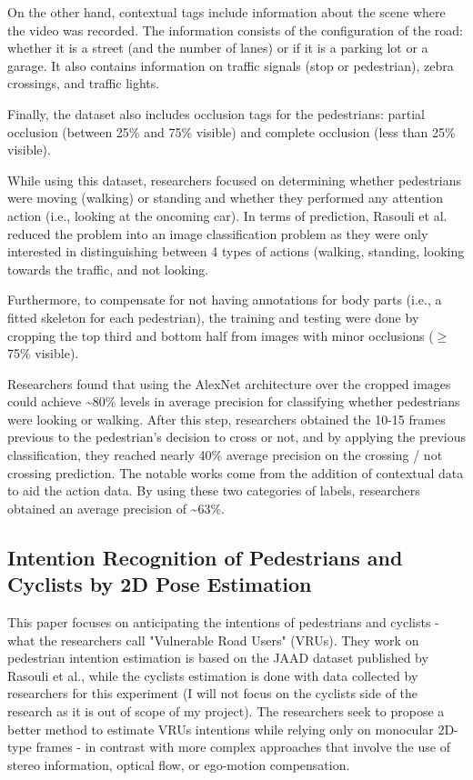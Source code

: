 \documentclass[conference, onecolumn]{IEEEtran}
\begin{document}
On the other hand, contextual tags include information about the scene where the video was recorded. The information consists of the configuration of the road: whether it is a street (and the number of lanes) or if it is a parking lot or a garage. It also contains information on traffic signals (stop or pedestrian), zebra crossings, and traffic lights.

Finally, the dataset also includes occlusion tags for the pedestrians: partial occlusion (between 25\% and 75\% visible) and complete occlusion (less than 25\% visible).

While using this dataset, researchers focused on determining whether pedestrians were moving (walking) or standing and whether they performed any attention action (i.e., looking at the oncoming car). In terms of prediction, Rasouli et al. reduced the problem into an image classification problem as they were only interested in distinguishing between 4 types of actions (walking, standing, looking towards the traffic, and not looking.

Furthermore, to compensate for not having annotations for body parts (i.e., a fitted skeleton for each pedestrian), the training and testing were done by cropping the top third and bottom half from images with minor occlusions ($\ge$ 75\% visible).

Researchers found that using the AlexNet architecture over the cropped images could achieve \textasciitilde80\% levels in average precision for classifying whether pedestrians were looking or walking. After this step, researchers obtained the 10-15 frames previous to the pedestrian's decision to cross or not, and by applying the previous classification, they reached nearly 40\% average precision on the crossing / not crossing prediction. The notable works come from the addition of contextual data to aid the action data. By using these two categories of labels, researchers obtained an average precision of \textasciitilde63\%.

\subsection{Intention Recognition of Pedestrians and Cyclists by 2D Pose Estimation}\label{intention-recognition-of-pedestrians-and-cyclists-by-2d-pose-estimation}

This paper focuses on anticipating the intentions of pedestrians and cyclists - what the researchers call "Vulnerable Road Users" (VRUs).  They work on pedestrian intention estimation is based on the JAAD dataset published by Rasouli et al.\cite{rasouli2017ICCVW}, while the cyclists estimation is done with data collected by researchers for this experiment (I will not focus on the cyclists side of the research as it is out of scope of my project). The researchers seek to propose a better method to estimate VRUs intentions while relying only on monocular 2D-type frames - in contrast with more complex approaches that involve the use of stereo information, optical flow, or ego-motion compensation.
\end{document}
